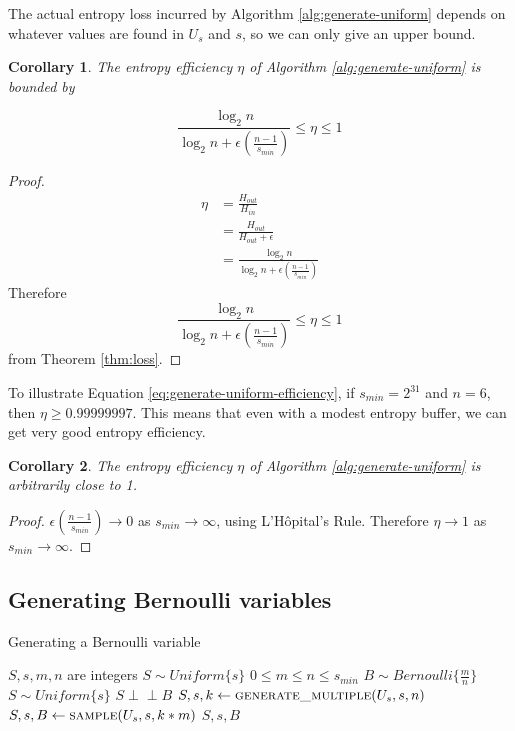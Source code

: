 \documentclass[12pt]{article}
\newtheorem{corollary}{Corollary}
\newcommand{\indep}{\perp\!\!\!\perp}
\begin{document}
The actual entropy loss incurred by Algorithm \ref{alg:generate-uniform} depends on whatever values are found in $U_s$ and $s$, so we can only give an upper bound.

\begin{corollary}
The entropy efficiency $\eta$ of Algorithm \ref{alg:generate-uniform} is bounded by

\begin{equation}
\frac{\log_2n}{\log_2n + \epsilon(\frac{n-1}{s_{min}})} \le \eta \le 1
\label{eq:generate-uniform-efficiency}
\end{equation}
\end{corollary}

\begin{proof}
\begin{align}
    \eta & = \frac{H_{out}}{H_{in}} \\
         & = \frac{H_{out}}{H_{out}+\epsilon} \\
         & = \frac{\log_2n}{\log_2n + \epsilon(\frac{n-1}{s_{min}})}
\end{align}
Therefore 
\begin{equation}
\frac{\log_2n}{\log_2n + \epsilon(\frac{n-1}{s_{min}})} \le \eta \le 1
\end{equation}
from Theorem \ref{thm:loss}.
\end{proof}

To illustrate Equation \ref{eq:generate-uniform-efficiency}, if $s_{min}=2^{31}$ and $n=6$, then $\eta \ge 0.99999997$. This means that even with a modest entropy buffer, we can get very good entropy efficiency.

\begin{corollary}
The entropy efficiency $\eta$ of Algorithm \ref{alg:generate-uniform} is arbitrarily close to 1.
\end{corollary}

\begin{proof}
$\epsilon(\frac{n-1}{s_{min}}) \rightarrow 0$ as $s_{min} \rightarrow \infty$, using L'H\^opital's Rule. Therefore $\eta \rightarrow 1$ as $s_{min} \rightarrow \infty$.
\end{proof}



\subsection{Generating Bernoulli variables}

\begin{algorithm}
\caption{Generating a Bernoulli variable}
\label{alg:generate-bernoulli}
\begin{algorithmic}[1]
\Require $S, s, m, n$ are integers
\Require $S \sim Uniform\{s\}$
\Require $0 \le m \le n\le s_{min}$
\Ensure $B \sim Bernoulli\{\frac{m}{n}\}$
\Ensure $S \sim Uniform\{s\}$
\Ensure $S \indep B$
  \State $S, s, k \gets \textsc{generate\_multiple}(U_s, s, n)$
  \State $S, s, B \gets \textsc{sample}(U_s, s, k * m)$
  \State \Return $S, s, B$
\EndProcedure
\end{algorithmic}
\end{algorithm}
\end{document}
